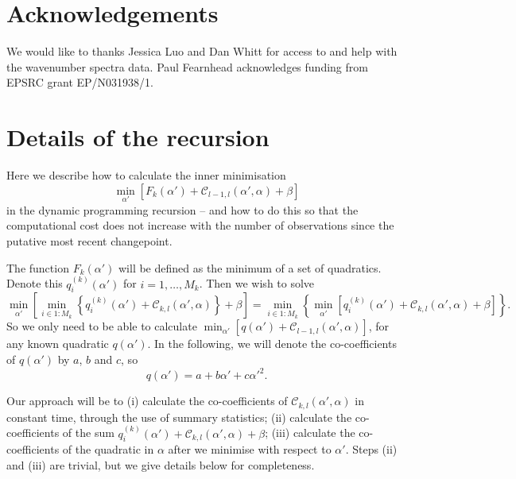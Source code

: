 \documentclass[article]{jss}
\begin{document}
\section{Acknowledgements}
We would like to thanks Jessica Luo and Dan Whitt for access to and help with the wavenumber spectra data. Paul Fearnhead acknowledges funding from EPSRC grant EP/N031938/1.


%


\appendix

\section{Details of the recursion} \label{App:cost_update}

Here we describe how to calculate the inner minimisation
\[
\min_{\alpha'} \left[
F_{k}(\alpha')+\mathcal{C}_{l-1,l}(\alpha',\alpha) +\beta
\right]
\]
in the dynamic programming recursion -- and how to do this so that the computational cost does not increase with the number of observations since the putative most recent changepoint.

The function $F_k(\alpha')$ will be defined as the minimum of a set of quadratics. Denote this $q^{(k)}_i(\alpha')$ for $i=1,\ldots,M_k$. Then we wish to solve
\[
\min_{\alpha'} \left[ \min_{i\in1:M_k} \left\{
q_{i}^{(k)}(\alpha')+\mathcal{C}_{k,l}(\alpha',\alpha)\right\} +\beta
\right] =
\min_{i\in 1:M_k}\left\{
\min_{\alpha'} \left[
q_{i}^{(k)}(\alpha')+\mathcal{C}_{k,l}(\alpha',\alpha) + \beta
\right]
\right\}.
\]
So we only need to be able to calculate $\min_{\alpha'} [q(\alpha')+\mathcal{C}_{l-1,l}(\alpha',\alpha)]$, for any known quadratic $q(\alpha')$. In the following, we will denote the co-coefficients of $q(\alpha')$ by $a$, $b$ and $c$, so
\[
q(\alpha')=a+b\alpha' + c\alpha'^2.
\]

Our approach will be to (i)  calculate the co-coefficients of $\mathcal{C}_{k,l}(\alpha',\alpha)$ in constant time, through the use of summary statistics; (ii) calculate the co-coefficients of the sum $q_{i}^{(k)}(\alpha')+\mathcal{C}_{k,l}(\alpha',\alpha) + \beta$; (iii) calculate the co-coefficients of the quadratic in $\alpha$ after we minimise with respect to $\alpha'$. Steps (ii) and (iii) are trivial, but we give details below for completeness.
\end{document}
